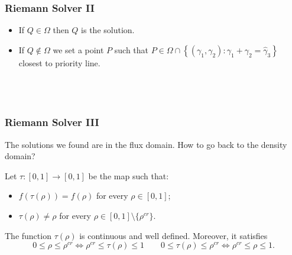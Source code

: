\begin{frame}[fragile]
	\frametitle{Riemann Solver II}
	\begin{itemize}
	\item<1-> If $Q\in \Omega$ then $Q$ is the solution.
	\only<1-1> {	\begin{figure}[ht]
\centering

\label{fig:Inside}
\end{figure}}
	\item<2-> If $Q \notin\Omega$ we set a point $P$ such that $P\in \Omega \cap \left\lbrace (\gamma_1,\gamma_2):\gamma_1+\gamma_2=\hat{\gamma}_3\right\rbrace $ closest to priority line.
	\only<2-2> {\begin{columns}
	\begin{figure}[ht]
\centering
{
\resizebox{.9\columnwidth}{!}{
}
\label{fig:P1}}
\end{figure}
	\begin{figure}[ht]
\centering
{
\resizebox{.9\columnwidth}{!}{
}
\label{fig:Ppoint2}}
\end{figure}
\end{columns}
	}
	\end{itemize}
\end{frame}	

\begin{frame}[fragile]
	\frametitle{Riemann Solver III}
The solutions we found are in the flux domain. How to go back to the density domain?
\begin{definition}
Let $\tau:[0,1]\rightarrow[0,1]$ be the map such that:
	\begin{itemize}
		\item $f(\tau(\rho))=f(\rho)$ for every $\rho\in [0,1]$;
		\item $\tau(\rho)\neq\rho$ for every $\rho\in[0,1]\setminus\{\rho^{cr}\}.$
	\end{itemize}
\end{definition}	
The function $\tau(\rho)$ is continuous and well defined. Moreover, it satisfies $$0\leq\rho\leq\rho^{cr}  \Longleftrightarrow \rho^{cr}\leq\tau(\rho)\leq 1 \qquad 0\leq\tau(\rho)\leq\rho^{cr}  \Longleftrightarrow \rho^{cr}\leq\rho\leq 1.$$
\end{frame}

